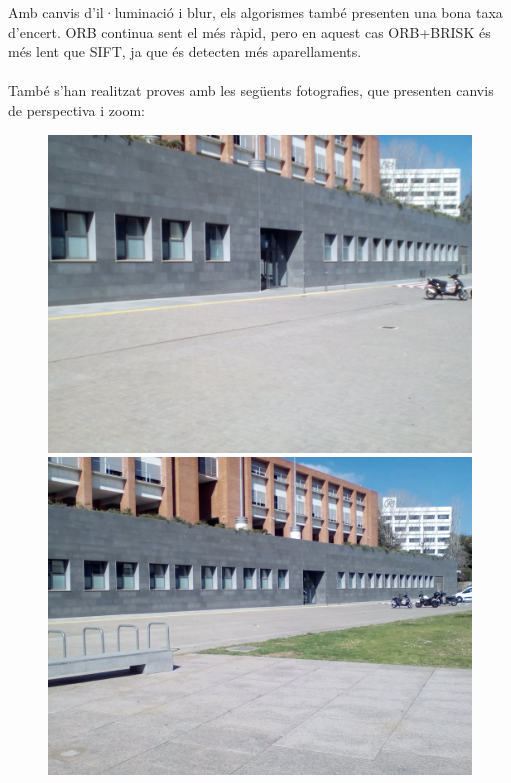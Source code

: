 		\noindent
		Amb canvis d'il·luminació i blur, els algorismes també presenten una bona taxa d'encert. ORB continua sent el més ràpid, pero en aquest cas ORB+BRISK és més lent que SIFT, ja que és detecten més
		aparellaments.\\\\
		També s'han realitzat proves amb les següents fotografies, que presenten canvis de perspectiva i zoom:

		\begin{figure}[!htb]
				\includegraphics[width=\linewidth]{images/experiments/uni1}
				\label{fig:awesome_image1}
			\endminipage\hfill
				\includegraphics[width=\linewidth]{images/experiments/uni2}

\end{figure}
